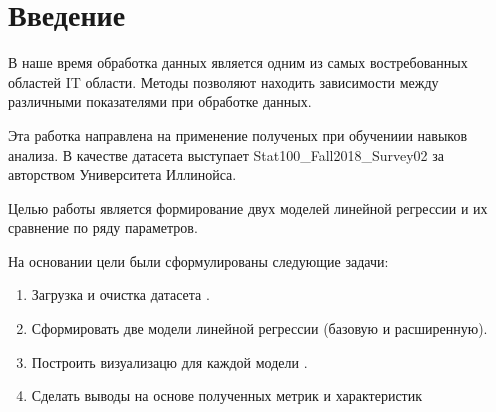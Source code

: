 \chapter{Введение}
В наше время обработка данных является одним из самых востребованных областей IT области.
Методы позволяют находить  зависимости между различными показателями при обработке данных.

Эта работка направлена на применение полученых при обучениии навыков анализа.
В качестве датасета выступает Stat100\_Fall2018\_Survey02 за авторством Университета Иллинойса.

Целью работы является формирование двух моделей линейной регрессии и их сравнение по ряду параметров.

На основании цели были сформулированы следующие задачи:
\begin{enumerate}
	\item Загрузка и очистка датасета .
	\item Сформировать две модели линейной регрессии (базовую и расширенную).
	\item Построить визуализацю для каждой модели .
	\item Сделать выводы на основе полученных метрик и характеристик
\end{enumerate}